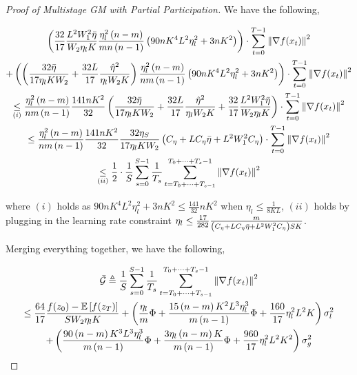 \begin{proof}[Proof of Multistage GM with Partial Participation]
We have the following,

\begin{equation}
\begin{gathered}
\left( \frac{32}{17} \frac{L^2 W_1^2 \Bar{\eta}}{W_2 \eta_l K}\frac{\eta_l^2\left(n-m\right)}{m n\left(n-1\right)}\left(90nK^4L^2\eta_l^2+3nK^2\right)\right)\cdot \sum_{t=0}^{T-1}\left\|\nabla f(x_t)\right\|^2 \\
+  \left(\left(\frac{32\Bar{\eta}}{17 \eta_l K W_2} + \frac{32 L}{17}\frac{\hat{\eta}^2}{\eta_l W_2 K}\right)\frac{\eta_l^2\left(n-m\right)}{n m \left( n - 1 \right)}\left(90nK^4L^2\eta_l^2 + 3nK^2\right) \right)
\cdot \sum_{t=0}^{T-1}\left\|\nabla f(x_t)\right\|^2 \\
\underset{(i)}{\leq}\frac{\eta_l^2\left(n-m\right)}{n m \left( n - 1 \right)} \frac{141 nK^2}{32} \left(\frac{32\Bar{\eta}}{17 \eta_l K W_2} + \frac{32 L}{17}\frac{\hat{\eta}^2}{\eta_l W_2 K} + \frac{32}{17} \frac{L^2 W_1^2 \Bar{\eta}}{W_2 \eta_l K}\right)\cdot \sum_{t=0}^{T-1}\left\|\nabla f(x_t)\right\|^2\\
\leq \frac{\eta_l^2\left(n-m\right)}{n m \left( n - 1 \right)} \frac{141 nK^2}{32} \frac{32 \eta_S}{17\eta_l K W_2} \left(C_\eta+LC_\eta\Bar{\eta}+L^2W_1^2 C_\eta \right)\cdot \sum_{t=0}^{T-1}\left\|\nabla f(x_t)\right\|^2\\
\underset{(ii)}{\leq} \frac{1}{2} \cdot \frac{1}{S}\sum_{s=0}^{S-1} \frac{1}{T_s}\sum_{t=T_0+\dots+T_{s-1} }^{T_0+\dots+T_s-1} \left\|\nabla f(x_t)\right\|^2
\end{gathered}\nonumber
\end{equation}

where $(i)$ holds as $90nK^4L^2\eta_l^2+3nK^2\leq\frac{141}{32}nK^2$ when $\eta_l\leq\frac{1}{8KL}$, $(ii)$ holds by plugging in the learning rate constraint $\eta_l \leq \frac{17}{282} \frac{m}{\left(C_\eta + L C_\eta \Bar{\eta} + L^2 W_1^2 C_\eta\right)S K}$.


Merging everything together, we have the following,

\begin{equation}
\begin{gathered}
\Bar{\mathcal{G}}\triangleq\frac{1}{S}\sum_{s=0}^{S-1} \frac{1}{T_s}\sum_{t=T_0+\dots+T_{s-1} }^{T_0+\dots+T_s-1} \left\|\nabla f(x_t)\right\|^2\\
\leq \frac{64}{17}\frac{f(z_0)-\mathbb{E}\left[f(z_{T})\right]}{S W_2 \eta_l K}  
+ \left( \frac{\eta_l}{m}\Phi +\frac{15\left(n-m\right)K^2L^3\eta_l^3}{m\left(n-1\right)}\Phi + \frac{160}{17} \eta_l^2L^2K \right)\sigma_l^2\\
+ \left(  \frac{90\left(n-m\right)K^3L^3\eta_l^3}{m\left(n-1\right)}\Phi  +  \frac{3\eta_l\left(n-m\right)K}{m\left(n-1\right)}\Phi     + \frac{960}{17} \eta_l^2L^2K^2         \right)\sigma_g^2
\end{gathered}\nonumber
\end{equation}




\end{proof}
